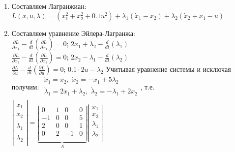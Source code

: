 \documentclass[preprint,russian,a5paper,10pt,twoside,mediummath]{ncc}
\begin{document}
\begin{enumerate}
\item Составляем Лагранжиан:
$L\left( x,u,\lambda  \right)=\left( x_{1}^{2}+x_{2}^{2}+0.1{{u}^{2}} \right)+{{\lambda }_{1}}\left( {{{\dot{x}}}_{1}}-{{x}_{2}} \right)+{{\lambda }_{2}}\left( {{{\dot{x}}}_{2}}+{{x}_{1}}-u \right)$
\item Составляем уравнение Эйлера-Лагранжа:
\\$\frac{\partial L}{\partial {{x}_{1}}}-\frac{d}{dt}\left( \frac{\partial L}{\partial {{{\dot{x}}}_{1}}} \right)=0$; $2{{x}_{1}}+{{\lambda }_{2}}-\frac{d}{dt}\left( {{\lambda }_{1}} \right)$
\\$\frac{\partial L}{\partial {{x}_{2}}}-\frac{d}{dt}\left( \frac{\partial L}{\partial {{{\dot{x}}}_{2}}} \right)=0$; $2{{x}_{2}}-{{\lambda }_{1}}-\frac{d}{dt}\left( {{\lambda }_{2}} \right)$
\\$\frac{\partial L}{\partial u}-\frac{d}{dt}\left( \frac{\partial L}{\partial \dot{u}} \right)=0$; $0.1\cdot 2u-{{\lambda }_{2}}$ 
Учитывая уравнение системы и исключая получим:
$\begin{array}{*{35}{l}}
   {{{\dot{x}}}_{1}}={{x}_{2}},\,\,{{{\dot{x}}}_{2}}=-{{x}_{1}}+5{{\lambda }_{2}}  \\
   {{{\dot{\lambda }}}_{1}}=2{{x}_{1}}+{{\lambda }_{2}},\,\,{{{\dot{\lambda }}}_{2}}=-{{\lambda }_{1}}+2{{x}_{2}}  \\
\end{array}$, т.е. $\left| \begin{matrix}
   {{{\dot{x}}}_{1}}  \\
   {{{\dot{x}}}_{2}}  \\
   {{{\dot{\lambda }}}_{1}}  \\
   {{{\dot{\lambda }}}_{2}}  \\
\end{matrix} \right|=\underbrace{\left| \begin{matrix}
   0 & 1 & 0 & 0  \\
   -1 & 0 & 0 & 5  \\
   2 & 0 & 0 & 1  \\
   0 & 2 & -1 & 0  \\
\end{matrix} \right|}_{A}\left| \begin{matrix}
   {{x}_{1}}  \\
   {{x}_{2}}  \\
   {{\lambda }_{1}}  \\
   {{\lambda }_{2}}  \\
\end{matrix} \right|$

\end{enumerate}
\end{document}
